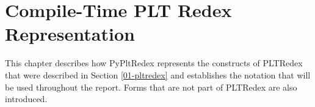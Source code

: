 \chapter{Compile-Time PLT Redex Representation}
\label{chapter05}

This chapter describes how PyPltRedex represents the constructs of PLTRedex that were described in Section \ref{01-pltredex} and establishes the notation that will be used throughout the report. Forms that are not part of PLTRedex are also introduced.





